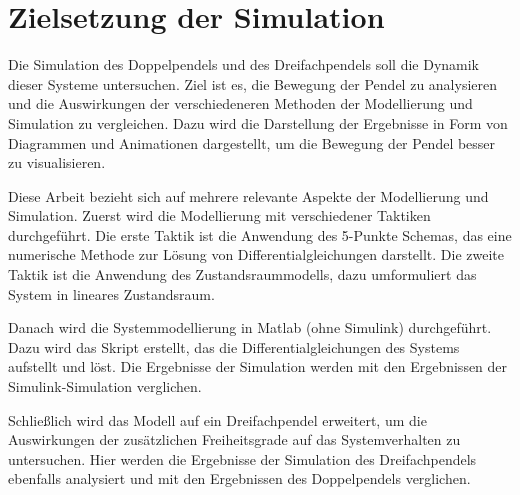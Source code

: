 \chapter{Zielsetzung der Simulation}\label{ch:Zielsetzung}
Die Simulation des Doppelpendels und des Dreifachpendels soll die Dynamik dieser Systeme untersuchen. Ziel ist es, die Bewegung der Pendel zu analysieren und die Auswirkungen der verschiedeneren Methoden der Modellierung und Simulation zu vergleichen. Dazu wird die Darstellung der Ergebnisse in Form von Diagrammen und Animationen dargestellt, um die Bewegung der Pendel besser zu visualisieren.

Diese Arbeit bezieht sich auf mehrere relevante Aspekte der Modellierung und Simulation. Zuerst wird die Modellierung mit verschiedener Taktiken durchgeführt. Die erste Taktik ist die Anwendung des 5-Punkte Schemas, das eine numerische Methode zur Lösung von Differentialgleichungen darstellt. Die zweite Taktik ist die Anwendung des Zustandsraummodells, dazu umformuliert das System in lineares Zustandsraum.

Danach wird die Systemmodellierung in Matlab (ohne Simulink) durchgeführt. Dazu wird das Skript erstellt, das die Differentialgleichungen des Systems aufstellt und löst. Die Ergebnisse der Simulation werden mit den Ergebnissen der Simulink-Simulation verglichen. 

Schließlich wird das Modell auf ein Dreifachpendel erweitert, um die Auswirkungen der zusätzlichen Freiheitsgrade auf das Systemverhalten zu untersuchen. Hier werden die Ergebnisse der Simulation des Dreifachpendels ebenfalls analysiert und mit den Ergebnissen des Doppelpendels verglichen.
 




